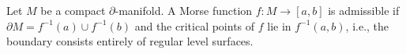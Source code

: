 Let $M$ be a compact $\partial$-manifold. A Morse function $f: M \to [a, b]$ is admissible if $\partial M = f^{-1}(a) \cup f^{-1}(b)$ and the critical points of $f$ lie in $f^{-1}(a, b)$, i.e., the boundary consists entirely of regular level surfaces.
